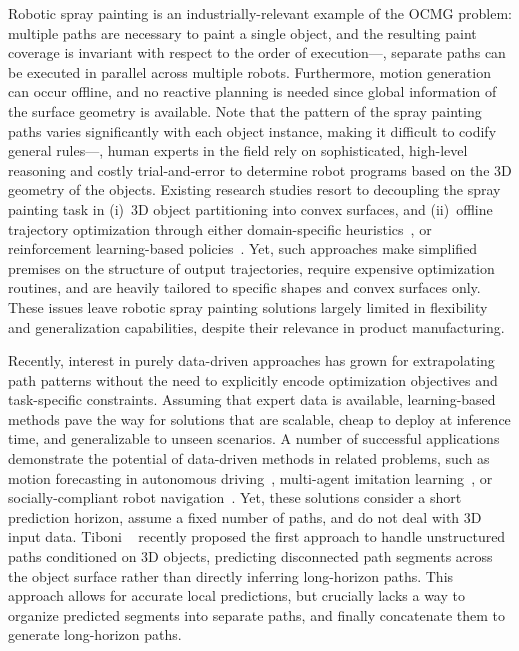 Robotic spray painting is an industrially-relevant example of the OCMG problem:
multiple paths are necessary to paint a single object, and the resulting paint coverage is invariant with respect to the order of execution---\eg, separate paths can be executed in parallel across multiple robots.
Furthermore, motion generation can occur offline, and no reactive planning is needed since global information of the surface geometry is available.
Note that the pattern of the spray painting paths varies significantly with each object instance, making it difficult to codify general rules---\eg, human experts in the field rely on sophisticated, high-level reasoning and costly trial-and-error to determine robot programs based on the 3D geometry of the objects.
%
%
%
Existing research studies resort to decoupling the spray painting task in (i)~3D object partitioning into convex surfaces, and (ii)~offline trajectory optimization through either domain-specific heuristics~\cite{Sheng_Automated_2000,Chen_Automated_2008,Li_Automatic_2010,Andulkar_Incremental_2015,atkar24uniform,gleeson2022generating}, or reinforcement learning-based policies~\cite{Kiemel_PaintRL_2019}.
Yet, such approaches make simplified premises on the structure of output trajectories, require expensive optimization routines, and are heavily tailored to specific shapes and convex surfaces only.
%
These issues leave robotic spray painting solutions largely limited in flexibility and generalization capabilities, despite their relevance in product manufacturing.


Recently, interest in purely data-driven approaches has grown for extrapolating path patterns without the need to explicitly encode optimization objectives and task-specific constraints.
Assuming that expert data is available, learning-based methods pave the way for solutions that are scalable, cheap to deploy at inference time, and generalizable to unseen scenarios.
%
A number of successful applications demonstrate the potential of data-driven methods in related problems, such as motion forecasting in autonomous driving~\cite{yuan2021agentformer,ngiam2022scenetr,varadarajan2022multipath++,nayakanti2023wayformer}, multi-agent imitation learning~\cite{SRINIVASAN2021598}, or socially-compliant robot navigation~\cite{kretzschmar2013featuretrajpred,kretzschmar2014learningsocialnavigation,pfeiffer2016predicting}.
Yet, these solutions consider a short prediction horizon, assume a fixed number of paths, and do not deal with 3D input data.
%
%
Tiboni \etal~\cite{tiboni2023paintnet} recently proposed the first approach to handle unstructured paths conditioned on 3D objects, predicting disconnected path segments across the object surface rather than directly inferring long-horizon paths. 
This approach allows for accurate local predictions, but crucially lacks a way to organize predicted segments into separate paths, and finally concatenate them to generate long-horizon paths.



